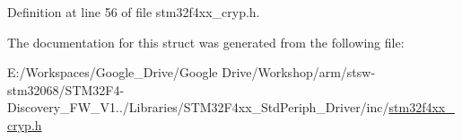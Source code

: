 Definition at line 56 of file stm32f4xx\-\_\-cryp.\-h.



The documentation for this struct was generated from the following file\-:\begin{DoxyCompactItemize}
\item 
E\-:/\-Workspaces/\-Google\-\_\-\-Drive/\-Google Drive/\-Workshop/arm/stsw-\/stm32068/\-S\-T\-M32\-F4-\/\-Discovery\-\_\-\-F\-W\-\_\-\-V1../\-Libraries/\-S\-T\-M32\-F4xx\-\_\-\-Std\-Periph\-\_\-\-Driver/inc/\hyperlink{stm32f4xx__cryp_8h}{stm32f4xx\-\_\-cryp.\-h}\end{DoxyCompactItemize}
